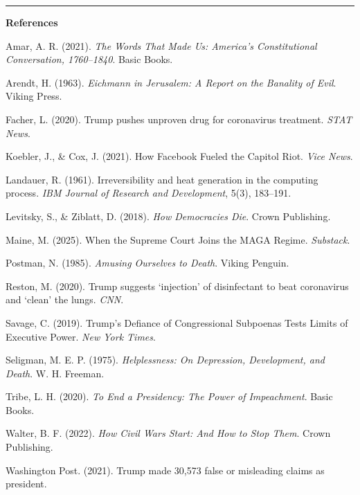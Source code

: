 \documentclass[
]{article}
\begin{document}
\begin{center}\rule{0.5\linewidth}{0.5pt}\end{center}

\textbf{References}

Amar, A. R. (2021). \emph{The Words That Made Us: America's Constitutional Conversation, 1760--1840}. Basic Books.

Arendt, H. (1963). \emph{Eichmann in Jerusalem: A Report on the Banality of Evil}. Viking Press.

Facher, L. (2020). Trump pushes unproven drug for coronavirus treatment. \emph{STAT News}.

Koebler, J., \& Cox, J. (2021). How Facebook Fueled the Capitol Riot. \emph{Vice News}.

Landauer, R. (1961). Irreversibility and heat generation in the computing process. \emph{IBM Journal of Research and Development}, 5(3), 183--191.

Levitsky, S., \& Ziblatt, D. (2018). \emph{How Democracies Die}. Crown Publishing.

Maine, M. (2025). When the Supreme Court Joins the MAGA Regime. \emph{Substack}.

Postman, N. (1985). \emph{Amusing Ourselves to Death}. Viking Penguin.

Reston, M. (2020). Trump suggests `injection' of disinfectant to beat coronavirus and `clean' the lungs. \emph{CNN}.

Savage, C. (2019). Trump's Defiance of Congressional Subpoenas Tests Limits of Executive Power. \emph{New York Times}.

Seligman, M. E. P. (1975). \emph{Helplessness: On Depression, Development, and Death}. W. H. Freeman.

Tribe, L. H. (2020). \emph{To End a Presidency: The Power of Impeachment}. Basic Books.

Walter, B. F. (2022). \emph{How Civil Wars Start: And How to Stop Them}. Crown Publishing.

Washington Post. (2021). Trump made 30,573 false or misleading claims as president.
\end{document}

